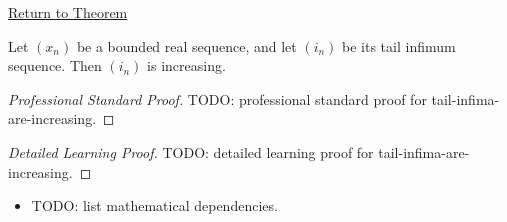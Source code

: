 \newpage
{}
\label{prf:tail-infima-are-increasing}

\begin{remark*}[Return]
\hyperref[thm:tail-infima-are-increasing]{Return to Theorem}
\end{remark*}

\begin{theorem*}
Let $(x_n)$ be a bounded real sequence, and let $(i_n)$ be its tail
infimum sequence. Then $(i_n)$ is increasing.

\smallskip
\noindent
\end{theorem*}

\begin{proof}[Professional Standard Proof]
\LRAProofBodyStart
TODO: professional standard proof for tail-infima-are-increasing.
\end{proof}

\begin{proof}[Detailed Learning Proof]
\LRAProofBodyStart
TODO: detailed learning proof for tail-infima-are-increasing.
\end{proof}

\begin{remark*}
\end{remark*}

\begin{dependencies}
\begin{itemize}
  \item TODO: list mathematical dependencies.
\end{itemize}
\end{dependencies}

\clearpage
